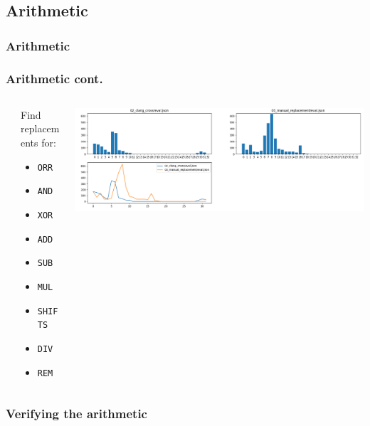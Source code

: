 \documentclass[11pt,t,usepdftitle=false,aspectratio=169]{beamer}
\begin{document}
\subsection{Arithmetic}
\begin{frame}
  \frametitle{Arithmetic}
\end{frame}

\begin{frame}
  \frametitle{Arithmetic cont.}

  \begin{columns}[T] %
    \begin{column}{.05\textwidth}
    \end{column}
    \hfill
    \begin{column}{.38\textwidth}
      Find replacements for:
      \begin{itemize}
      \item \texttt{ORR}
      \item \texttt{AND}
      \item \texttt{XOR}
      \item \texttt{ADD}
      \item \texttt{SUB}
      \item \texttt{MUL}
      \item \texttt{SHIFTS}
      \item \texttt{DIV}
      \item \texttt{REM}
      \end{itemize}
    \end{column}%
    \hfill%
    \begin{column}{.48\textwidth}
      \includegraphics[width=\textwidth, height=0.7\textheight,draft]{placeholder}
    \end{column}%
  \end{columns}
\end{frame}

\begin{frame}
  \frametitle{Verifying the arithmetic}

  
\end{frame}
\end{document}
